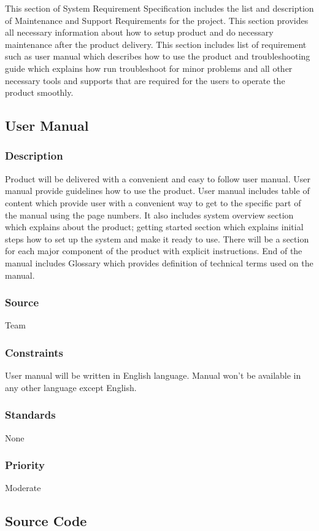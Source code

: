 This section of System Requirement Specification includes the list and description of Maintenance and Support Requirements for the project. This section provides all necessary information about how to setup product and do necessary maintenance after the product delivery. This section includes list of requirement such as user manual which describes how to use the product and troubleshooting guide which explains how run troubleshoot for minor problems and all other necessary tools and supports that are required for the users to operate the product smoothly. 

\subsection{User Manual}
\subsubsection{Description}
Product will be delivered with a convenient and easy to follow user manual. User manual provide guidelines how to use the product. User manual includes table of content which provide user with a convenient way to get to the specific part of the manual using the page numbers. It also includes system overview section which explains about the product; getting started section which explains initial steps how to set up the system and make it ready to use. There will be a section for each major component of the product with explicit instructions. End of the manual includes Glossary which provides definition of technical terms used on the manual. 
\subsubsection{Source}
Team
\subsubsection{Constraints}
User manual will be written in English language. Manual won't be available in any other language except English. 
\subsubsection{Standards}
None
\subsubsection{Priority}
Moderate

\subsection{Source Code}
